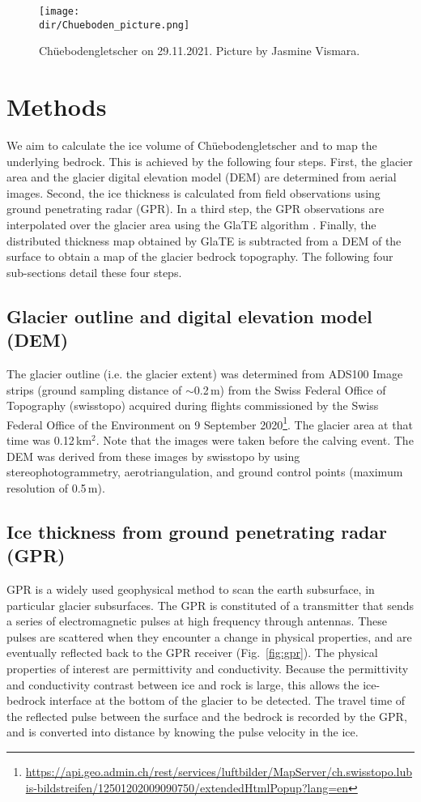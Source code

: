 \begin{figure}
\centering
\texttt{[image: \\dir/Chueboden\_picture.png]}
\caption{Chüebodengletscher on 29.11.2021. Picture by Jasmine Vismara.}
\label{fig:photo}
\end{figure}


\section{Methods}

We aim to calculate the ice volume of Chüebodengletscher and to map the underlying bedrock. This is achieved by the following four steps. First, the glacier area and the glacier digital elevation model (DEM) are determined from aerial images. Second, the ice thickness is calculated from field observations using ground penetrating radar (GPR). In a third step, the GPR observations are interpolated over the glacier area using the GlaTE algorithm \citep{Langhammer&al2019}. Finally, the distributed thickness map obtained by GlaTE is subtracted from a DEM of the surface to obtain a map of the glacier bedrock topography. The following four sub-sections detail these four steps.

\subsection{Glacier outline and digital elevation model (DEM)}
\label{subsection:glacierarea}

The glacier outline (i.e. the glacier extent) was determined from ADS100 Image strips (ground sampling distance of $\sim$0.2\,m) from the Swiss Federal Office of Topography (swisstopo) acquired during flights commissioned by the Swiss Federal Office of the Environment on 9 September 2020\footnote{\url{https://api.geo.admin.ch/rest/services/luftbilder/MapServer/ch.swisstopo.lubis-bildstreifen/12501202009090750/extendedHtmlPopup?lang=en}}. The glacier area at that time was 0.12\,km$^2$. Note that the images were taken before the calving event. The DEM was derived from these images by swisstopo by using stereophotogrammetry, aerotriangulation, and ground control points (maximum resolution of 0.5\,m).

\subsection{Ice thickness from ground penetrating radar (GPR)}

GPR is a widely used geophysical method to scan the earth subsurface, in particular glacier subsurfaces. The GPR is constituted of a transmitter that sends a series of electromagnetic pulses at high frequency through antennas. These pulses are scattered when they encounter a change in physical properties, and are eventually reflected back to the GPR receiver (Fig.~\ref{fig:gpr}). The physical properties of interest are permittivity and conductivity. Because the permittivity and conductivity contrast between ice and rock is large, this allows the ice-bedrock interface at the bottom of the glacier to be detected. The travel time of the reflected pulse between the surface and the bedrock is recorded by the GPR, and is converted into distance by knowing the pulse velocity in the ice. 

